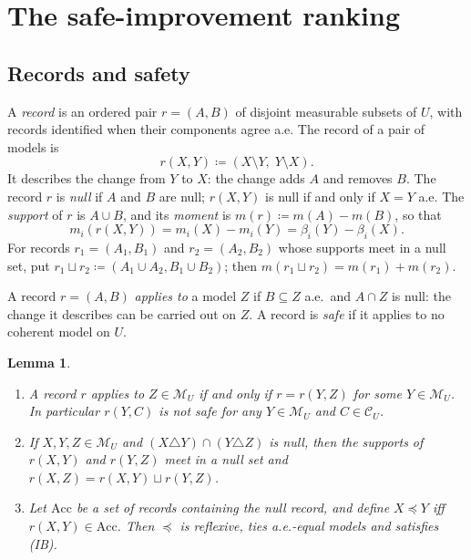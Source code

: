 \documentclass[11pt]{article}
\newcommand{\M}{\mathcal{M}}
\newcommand{\CC}{\mathcal{C}}
\newcommand{\Acc}{\mathrm{Acc}}
\theoremstyle{plain}
\newtheorem{lemma}[theorem]{Lemma}
\theoremstyle{definition}
\theoremstyle{remark}
\begin{document}
\section{The safe-improvement ranking}\label{sec:ranking}

\subsection{Records and safety}

A \emph{record} is an ordered pair $r=(A,B)$ of disjoint measurable subsets of $U$, with
records identified when their components agree a.e. The record of a pair of models is
\[
  r(X,Y)\coloneqq(X\setminus Y,\;Y\setminus X).
\]
It describes the change from $Y$ to $X$: the change adds $A$ and removes $B$. The record
$r$ is \emph{null} if $A$ and $B$ are null; $r(X,Y)$ is null if and only if $X=Y$ a.e.
The \emph{support} of $r$ is $A\cup B$, and its \emph{moment} is $m(r)\coloneqq
m(A)-m(B)$, so that
\[
  m_i(r(X,Y))=m_i(X)-m_i(Y)=\beta_i(Y)-\beta_i(X).
\]
For records $r_1=(A_1,B_1)$ and $r_2=(A_2,B_2)$ whose supports meet in a null set, put
$r_1\sqcup r_2\coloneqq(A_1\cup A_2,B_1\cup B_2)$; then $m(r_1\sqcup r_2)=m(r_1)+m(r_2)$.

A record $r=(A,B)$ \emph{applies to} a model $Z$ if $B\subseteq Z$ a.e.\ and $A\cap Z$ is
null: the change it describes can be carried out on $Z$. A record is \emph{safe} if it
applies to no coherent model on $U$.

\begin{lemma}\label{lem:record}
\begin{enumerate}[label=(\alph*)]
  \item A record $r$ applies to $Z\in\M_U$ if and only if $r=r(Y,Z)$ for some
  $Y\in\M_U$. In particular $r(Y,C)$ is not safe for any $Y\in\M_U$ and $C\in\CC_U$.
  \item If $X,Y,Z\in\M_U$ and $(X\triangle Y)\cap(Y\triangle Z)$ is null, then the
  supports of $r(X,Y)$ and $r(Y,Z)$ meet in a null set and $r(X,Z)=r(X,Y)\sqcup r(Y,Z)$.
  \item Let $\Acc$ be a set of records containing the null record, and define $X\preceq Y$
  iff $r(X,Y)\in\Acc$. Then $\preceq$ is reflexive, ties a.e.-equal models and satisfies
  (IB).
\end{enumerate}
\end{lemma}
\end{document}
